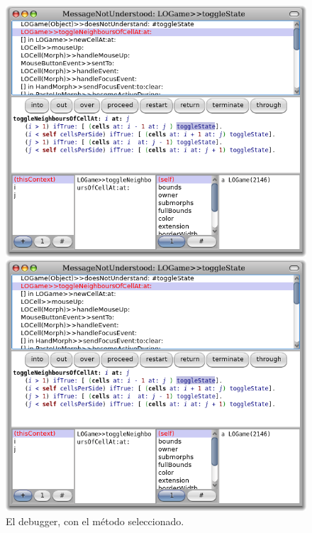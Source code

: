 \documentclass[a4paper,10pt,twoside]{book}
\begin{document}
{\begin{figure}[ht]
\ifluluelse
	{\centerline {\includegraphics[width=\textwidth]{Debugger}}}
	{\centerline {\includegraphics[scale=0.7]{Debugger}}}
\caption{El debugger, con el m\'etodo   seleccionado.
}
\end{figure}

}
\end{document}

